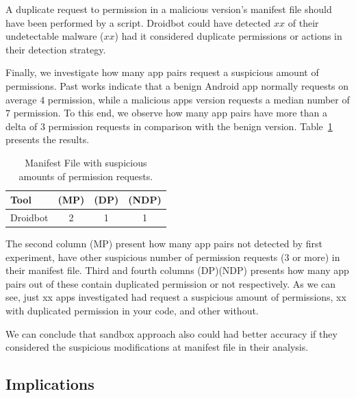 A duplicate request to permission in a malicious version's manifest file should have been performed by a script.  Droidbot could have detected $xx$ of their undetectable malware ($xx$) had it considered duplicate permissions or actions in their detection strategy.

Finally, we investigate how many app pairs request a suspicious amount of permissions. Past works indicate that a benign Android app normally requests on average $4$ permission, while a malicious apps version requests a median number of $7$ permission\cite{DBLP:conf/soups/FeltHEHCW12}\cite{DBLP:journals/tifs/0029LBKTLC17}. To this end, we observe how many app pairs have more than a delta of $3$ permission requests in comparison with the benign version. Table~\ref{tab:mp} presents the results.

\begin{table}[ht]
  \caption{Manifest File with suspicious amounts of permission requests.}
  \centering
  \begin{small}
 \begin{tabular}{lccc}
   \toprule
   Tool & (MP) & (DP) & (NDP) \\   \midrule
   
   Droidbot &  2 & 1 & 1 \\ 
   
 \bottomrule
 \end{tabular}
 \end{small}
 \label{tab:mp}
\end{table}

The second column (MP) present how many app pairs not detected by first experiment, have other suspicious number of permission requests ($3$ or more) in their manifest file. Third and fourth columns (DP)(NDP) presents how many app pairs out of these contain duplicated permission or not respectively. As we can see, just xx apps investigated had request a suspicious amount of permissions, xx with duplicated permission in your code, and other without.


\begin{obs}{3}{}
 We can conclude that sandbox approach also could had better accuracy if they considered the suspicious modifications at manifest file in their analysis.
\end{obs}

\subsection{Implications}\label{sec:implications}


